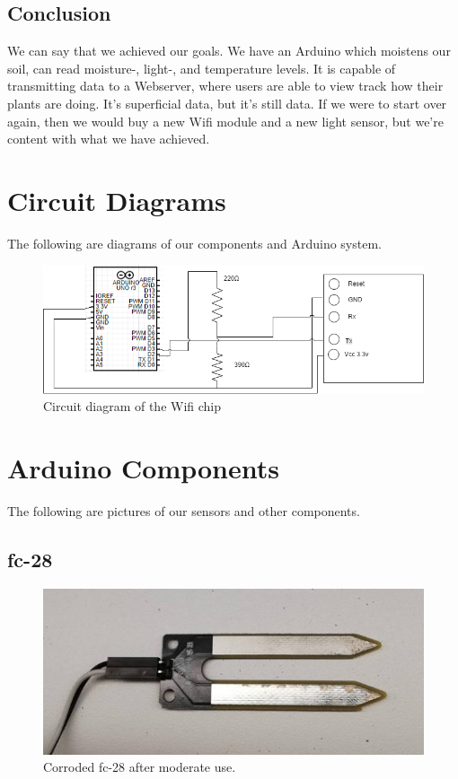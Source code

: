 \documentclass[a4paper,12pt,twoside,openright,titlepage]{book}
\begin{document}
\section{Conclusion}
We can say that we achieved our goals. We have an Arduino which moistens our soil, can read moisture-, light-, and temperature levels. It is capable of transmitting data to a Webserver, where users are able to view track how their plants are doing. It's superficial data, but it's still data. If we were to start over again, then we would buy a new Wifi module and a new light sensor, but we're content with what we have achieved.
\appendix
\chapter{Circuit Diagrams}
The following are diagrams of our components and Arduino system.
\begin{figure}[!ht]
  \centering
      \includegraphics[scale=0.8]{Circuit-Diagram-Wifi-8266}
  \caption{Circuit diagram of the Wifi chip}
  \label{fig:Wifi Circuit}
\end{figure}


\chapter{Arduino Components}
The following are pictures of our sensors and other components.

\section{fc-28}
\begin{figure}[!ht]
  \centering
      \includegraphics{fc-28-corrosion}
  \caption{Corroded fc-28 after moderate use.}
  \label{fig:resistive}
\end{figure}
\end{document}
